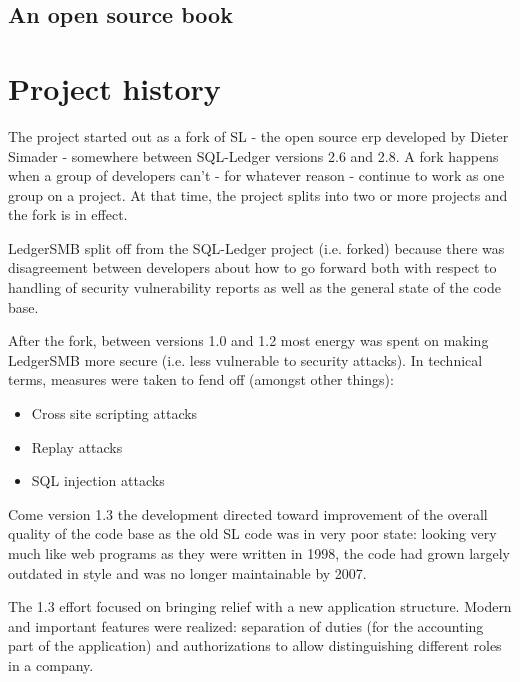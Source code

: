 \section{An open source book}
\label{sec-open-source-book}

\chapter{Project history}

\label{cha-ledgersmb-history}


The project started out as a fork of \gls{SL} - the open source \gls{erp}
developed by Dieter Simader - somewhere between SQL-Ledger versions 2.6
and 2.8.  A fork happens when a group of developers can't - for whatever
reason - continue to work as one group on a project.  At that time, the
project splits into two or more projects and the fork is in effect.

LedgerSMB split off from the SQL-Ledger project (i.e. forked) because
there was disagreement between developers about how to go forward both with
respect to handling of security vulnerability reports as well as the general
state of the code base.

After the fork, between versions 1.0 and 1.2 most energy was spent on
making LedgerSMB more secure (i.e. less vulnerable to security attacks).  In
technical terms, measures were taken to fend off (amongst other things):

\begin{itemize}
	\item Cross site scripting attacks
	\item Replay attacks
	\item SQL injection attacks
\end{itemize}

Come version 1.3 the development directed toward improvement of the overall
quality of the code base as the old \acrshort{SL} code was in very poor state:
looking very much like web programs as they were written in 1998, the code had
grown largely outdated in style and was no longer maintainable by 2007.

The 1.3 effort focused on bringing relief with a new application structure.
Modern and important features were realized: separation of duties (for the
accounting part of the application) and authorizations to allow distinguishing
different roles in a company.

